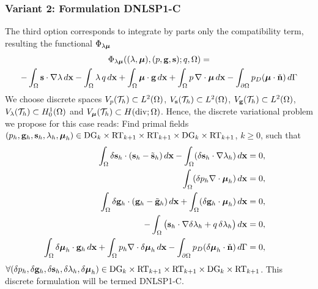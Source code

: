 \subsubsection{Variant 2: Formulation DNLSP1-C}

The third option corresponds to integrate by parts only the compatibility term,
resulting the functional $\Phi_{\lambda \boldsymbol{\mu}}$
\begin{multline}
\Phi_{\lambda \boldsymbol{\mu}}((\lambda, \boldsymbol{\mu}), (p, \mathbf{g}, \mathbf{s}); q, \Omega) =  \\
- \int_{\Omega} \mathbf{s} \cdot \nabla \lambda \, d\mathbf{x} - \int_{\Omega} \lambda \, q \, d\mathbf{x} + 
\int_{\Omega} \boldsymbol{\mu} \cdot \mathbf{g}\,d\mathbf{x}  + \int_{\Omega} p \, \nabla \cdot \boldsymbol{\mu} \,d\mathbf{x}
- \int_{\partial{\Omega}} {p_D (\boldsymbol{\mu} \cdot \check{\mathbf{n}})} \, d\Gamma \label{eq:Phi5C}
\end{multline}
We choose discrete spaces 
$V_{p}(\mathcal{T}_h) \subset L^2(\Omega)$, $V_{\mathbf{s}}(\mathcal{T}_h) \subset L^2(\Omega)$, $V_{\mathbf{g}}(\mathcal{T}_h) \subset L^2(\Omega)$, $V_{\lambda}(\mathcal{T}_h) \subset H^1_0(\Omega)$
and $V_{\boldsymbol{\mu}}(\mathcal{T}_h) \subset H(\text{div};\Omega)$.
Hence, the discrete variational problem we propose for this case reads:
Find primal fields
$(p_h,\mathbf{g}_h, \mathbf{s}_h, \lambda_h, \boldsymbol{\mu}_h ) \in \text{DG}_{k} \times \text{RT}_{k+1} \times \text{RT}_{k+1}
\times \text{DG}_{k} \times \text{RT}_{k+1}$, $k \ge 0$, such that
\begin{equation}
        \begin{aligned}
                \int_{\Omega}  \delta \mathbf{s}_h \cdot (\mathbf{s}_h - \tilde{\mathbf{s}}_h) \, d\mathbf{x} -
                \int_{\Omega}(\delta \mathbf{s}_h \cdot \nabla \lambda_h ) \, d\mathbf{x} & = 0, & \\
                 \int_{\Omega}(\delta p_h \nabla \cdot \boldsymbol{\mu}_h  ) \, d\mathbf{x} & = 0, &\\
                \int_{\Omega}  \delta \mathbf{g}_h \cdot (\mathbf{g}_h - \tilde{\mathbf{g}}_h) \, d\mathbf{x}  + \int_{\Omega} (\delta \mathbf{g}_h \cdot \boldsymbol{\mu}_h) \, d\mathbf{x} & = 0, &\\
 -\int_{\Omega} \big(\mathbf{s}_h \cdot \nabla \delta \lambda_h + q \, \delta \lambda_h \big) \, d\mathbf{x} & = 0, & \\
                 \int_{\Omega}{ \delta \boldsymbol{\mu}_h \cdot \mathbf{g}_h}\, d\mathbf{x}  + \int_{\Omega}{p_h \nabla  \cdot \delta \boldsymbol{\mu}_h}\, d\mathbf{x}
               - \int_{\partial{\Omega}}{ p_D (\delta{\boldsymbol{\mu}}_h \cdot \check{\mathbf{n}})}\,d\Gamma & = 0, &
        \end{aligned}
\end{equation}
$\forall (\delta p_h,\delta\mathbf{g}_h, \delta\mathbf{s}_h, \delta\lambda_h, \delta\boldsymbol{\mu}_h ) \in  \text{DG}_{k} \times \text{RT}_{k+1} \times \text{RT}_{k+1}
\times \text{DG}_{k} \times \text{RT}_{k+1}$.
This discrete formulation will be termed DNLSP1-C. 

